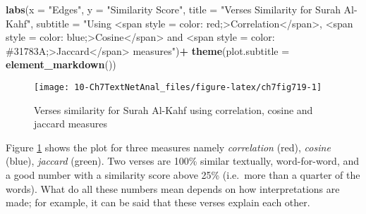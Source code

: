 \documentclass[
]{article}
\newenvironment{Shaded}{\begin{snugshade}}{\end{snugshade}}
\newcommand{\AttributeTok}[1]{\textcolor[rgb]{0.13,0.29,0.53}{#1}}
\newcommand{\FunctionTok}[1]{\textcolor[rgb]{0.13,0.29,0.53}{\textbf{#1}}}
\newcommand{\NormalTok}[1]{#1}
\newcommand{\SpecialCharTok}[1]{\textcolor[rgb]{0.81,0.36,0.00}{\textbf{#1}}}
\newcommand{\StringTok}[1]{\textcolor[rgb]{0.31,0.60,0.02}{#1}}
\begin{document}
\begin{Shaded}
\begin{Highlighting}[]
  \FunctionTok{labs}\NormalTok{(}\AttributeTok{x =} \StringTok{"Edges"}\NormalTok{, }\AttributeTok{y =} \StringTok{"Similarity Score"}\NormalTok{,}
       \AttributeTok{title =} \StringTok{"Verses Similarity for Surah Al{-}Kahf"}\NormalTok{,}
       \AttributeTok{subtitle =} \StringTok{"Using \textless{}span style = \textquotesingle{}color: red;\textquotesingle{}\textgreater{}Correlation\textless{}/span\textgreater{}, \textless{}span style = \textquotesingle{}color: blue;\textquotesingle{}\textgreater{}Cosine\textless{}/span\textgreater{} and \textless{}span style = \textquotesingle{}color: \#31783A;\textquotesingle{}\textgreater{}Jaccard\textless{}/span\textgreater{} measures"}\NormalTok{)}\SpecialCharTok{+}
  \FunctionTok{theme}\NormalTok{(}\AttributeTok{plot.subtitle =} \FunctionTok{element\_markdown}\NormalTok{())}
\end{Highlighting}
\end{Shaded}

\begin{figure}

{\centering \texttt{[image: 10-Ch7TextNetAnal\_files/figure-latex/ch7fig719-1]} 

}

\caption{Verses similarity for Surah Al-Kahf using correlation, cosine and jaccard measures}\label{fig:ch7fig719}
\end{figure}

Figure \ref{fig:ch7fig719} shows the plot for three measures namely \emph{correlation} (red), \emph{cosine} (blue), \emph{jaccard} (green). Two verses are 100\% similar textually, word-for-word, and a good number with a similarity score above 25\% (i.e.~more than a quarter of the words). What do all these numbers mean depends on how interpretations are made; for example, it can be said that these verses explain each other.
\end{document}
